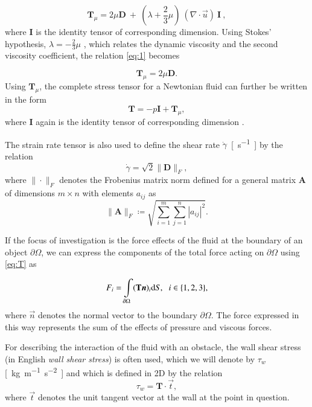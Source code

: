 \begin{equation}\label{eq:1}
	\mathbf{T}_{\mu} = 2 \mu \mathbf{D} \ + \ \left( \lambda + \frac{2}{3} \mu \right) \ (\nabla \cdot \vec{u}) \  \mathbf{I} \ ,
\end{equation}
where $ \mathbf{I} $ is the identity tensor of corresponding dimension. Using Stokes' hypothesis, $ \lambda = -\frac{2}{3} \mu $ \cite{Anderson}, which relates the dynamic viscosity and the second viscosity coefficient, the relation \eqref{eq:1} becomes

\begin{equation}
	\mathbf{T}_{\mu} = 2 \mu \mathbf{D}.
\end{equation}
Using $\mathbf{T}_{\mu}$, the complete stress tensor for a Newtonian fluid can further be written in the form
\begin{equation}\label{eq:T}
	\mathbf{T} = -p\mathbf{I} + \mathbf{T}_{\mu},
\end{equation}
where $ \mathbf{I} $ again is the identity tensor of corresponding dimension \cite{Cengel}.

The strain rate tensor is also used to define the shear rate $ \dot{\gamma} $~\si{[s^{-1}]} \cite{Cengel} by the relation
\begin{equation}\label{eq:dot gamma}
	\dot{\gamma} = \sqrt{2} \| \mathbf{D} \| _{F},
\end{equation}
where $ \| \cdot \| _{F} $ denotes the Frobenius matrix norm defined for a general matrix $ \mathbf{A} $ of dimensions $ m \times n $ with elements $ a_{ij} $ as
\begin{equation}
	\| \mathbf{A} \| _{F}  \coloneqq \sqrt{\sum_{i = 1}^{m} \sum_{j = 1}^{n} |a_{ij}|^2}.
\end{equation}

If the focus of investigation is the force effects of the fluid at the boundary of an object $ \partial \Omega $, we can express the components of the total force acting on $ \partial \Omega $ using \eqref{eq:T} as

\begin{equation}\label{eq:stress_int}
	{F}_{i} = \int\limits_{\partial\Omega}(\mathbf{T} \vec{n})_{i} \mathrm{d}S, \hspace{2mm} i \in \{1,2,3\},
\end{equation}
where $ \vec{n} $ denotes the normal vector to the boundary $ \partial \Omega $. The force expressed in this way represents the sum of the effects of pressure and viscous forces.

For describing the interaction of the fluid with an obstacle, the wall shear stress (in English \textit{wall shear stress}) \cite{WallStress} is often used, which we will denote by $ \tau _w $ \si{[kg.m^{-1}.s^{-2}]} and which is defined in 2D by the relation
\begin{equation}\label{eq:wall shear stress}
	\tau_w = \mathbf{T} \cdot \vec{t},
\end{equation}
where $ \vec{t} $ denotes the unit tangent vector at the wall at the point in question.

